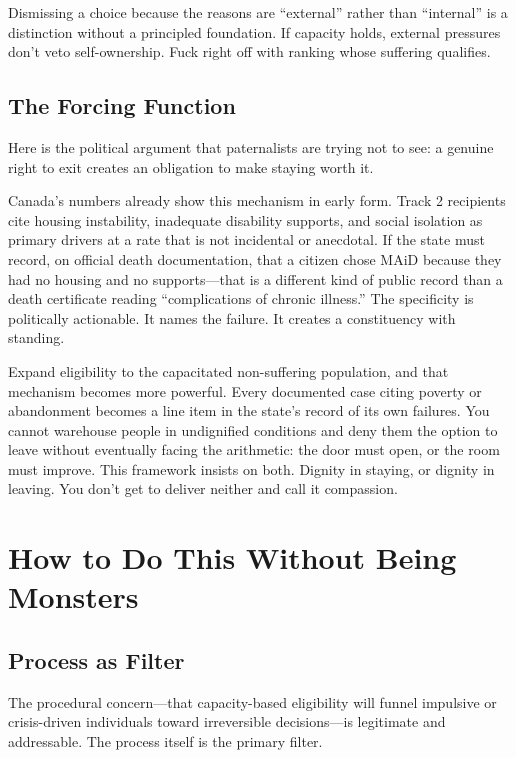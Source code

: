 \documentclass[10pt, letterpaper, twocolumn]{article}
\begin{document}
Dismissing a choice because the reasons are ``external'' rather than ``internal'' is a distinction without a principled foundation. If capacity holds, external pressures don't veto self-ownership. Fuck right off with ranking whose suffering qualifies.

\subsection{The Forcing Function}

Here is the political argument that paternalists are trying not to see: a genuine right to exit creates an obligation to make staying worth it.

Canada's numbers already show this mechanism in early form. Track 2 recipients cite housing instability, inadequate disability supports, and social isolation as primary drivers at a rate that is not incidental or anecdotal. If the state must record, on official death documentation, that a citizen chose MAiD because they had no housing and no supports---that is a different kind of public record than a death certificate reading ``complications of chronic illness.'' The specificity is politically actionable. It names the failure. It creates a constituency with standing.

Expand eligibility to the capacitated non-suffering population, and that mechanism becomes more powerful. Every documented case citing poverty or abandonment becomes a line item in the state's record of its own failures. You cannot warehouse people in undignified conditions and deny them the option to leave without eventually facing the arithmetic: the door must open, or the room must improve. This framework insists on both. Dignity in staying, or dignity in leaving. You don't get to deliver neither and call it compassion.

\section{How to Do This Without Being Monsters}

\subsection{Process as Filter}

The procedural concern---that capacity-based eligibility will funnel impulsive or crisis-driven individuals toward irreversible decisions---is legitimate and addressable. The process itself is the primary filter.
\end{document}
